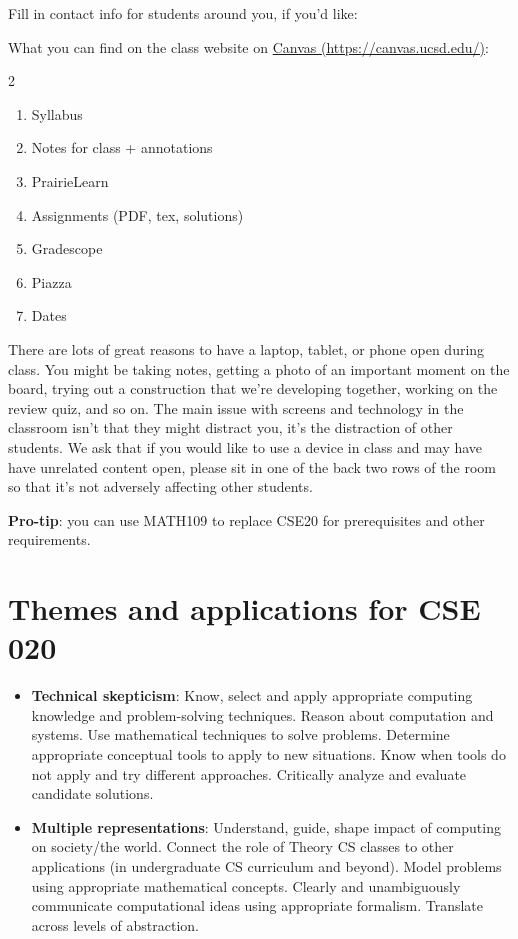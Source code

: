 \documentclass[12pt, oneside]{article}
\begin{document}
Fill in contact info for students around you, if you'd like:

\vfill
\vfill

What you can find on the class website on \href{https://canvas.ucsd.edu/}{Canvas (https://canvas.ucsd.edu/)}:

\begin{multicols}{2}
\begin{enumerate}
\item Syllabus
\item Notes for class + annotations
\item PrairieLearn
\item Assignments (PDF, tex, solutions)
\item Gradescope
\item Piazza
\item Dates
\end{enumerate}
\end{multicols}

\vfill
There are lots of great reasons to have a laptop, tablet, or phone open during class. You might be taking notes, 
getting a photo of an important moment on the board, trying out a construction that we're developing together, working 
on the review quiz, and so on. 
The main issue with screens and technology in the classroom isn't that they might 
distract you, 
it's the distraction of other students. We ask that if you would like to use
a device in class and may have 
have unrelated content open, please sit in one of the back two rows of the 
room so that it's not adversely affecting other students.

\vfill

{\bf Pro-tip}: you can use MATH109 to replace CSE20 for prerequisites and other requirements.

\vfill

\section*{Themes and applications for CSE 020}
\begin{itemize}
\item {\bf Technical skepticism}: Know, select and apply appropriate computing knowledge and problem-solving techniques. 
Reason about computation and systems. 
Use mathematical techniques to solve problems. 
Determine appropriate conceptual tools to apply to new situations. 
Know when tools do not apply and try different approaches. 
Critically analyze and evaluate candidate solutions.
\item {\bf Multiple representations}: Understand, guide, shape impact of computing on society/the world. 
Connect the role of Theory CS classes to other applications (in undergraduate CS curriculum and beyond). 
Model problems using appropriate mathematical concepts.
Clearly and unambiguously communicate computational ideas using appropriate formalism. 
Translate across levels of abstraction.
\end{itemize}
\end{document}
